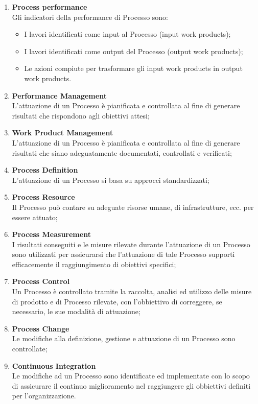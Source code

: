 \begin{enumerate}
\item \textbf{Process performance}\\
Gli indicatori della performance di Processo sono:
\begin{itemize} 
\item I lavori identificati come input al Processo (input work products);
\item I lavori identificati come output del Processo (output work products);
\item Le azioni compiute per trasformare gli input work products in output work products.
\end{itemize}

\item \textbf{Performance Management}\\
L’attuazione di un Processo è pianificata e controllata al fine di generare risultati che rispondono agli obiettivi attesi;
\item \textbf{Work Product Management}\\
L’attuazione di un Processo è pianificata e controllata al fine di generare risultati che siano adeguatamente documentati, controllati e verificati;
\item \textbf{Process Definition}\\
L’attuazione di un Processo si basa su approcci standardizzati;
\item \textbf{Process Resource}\\
Il Processo può contare su adeguate risorse umane, di infrastrutture, ecc. per essere attuato;
\item \textbf{Process Measurement}\\
I risultati conseguiti e le misure rilevate durante l’attuazione di un Processo sono utilizzati per assicurarsi che l’attuazione di tale Processo supporti efficacemente il raggiungimento di obiettivi specifici;
\item \textbf{Process Control}\\
Un Processo è controllato tramite la raccolta, analisi ed utilizzo delle misure di prodotto e di Processo rilevate, con l’obbiettivo di correggere, se necessario, le sue modalità di attuazione;
\item \textbf{Process Change}\\
Le modifiche alla definizione, gestione e attuazione di un Processo sono controllate;
\item \textbf{Continuous Integration}\\
Le modifiche ad un Processo sono identificate ed implementate con lo scopo di assicurare il continuo miglioramento nel raggiungere gli obbiettivi definiti per l’organizzazione.
\end{enumerate}	
